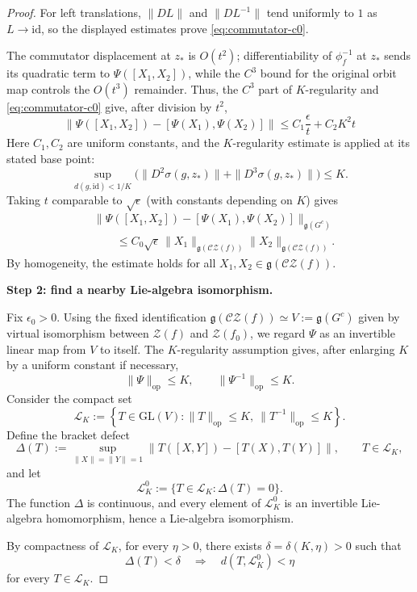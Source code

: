 \documentclass[11pt]{amsart}
\numberwithin{equation}{section}
\newcommand{\CZ}{\mathcal{CZ}}
\newcommand{\GL}{\mathrm{GL}}
\theoremstyle{plain}
\begin{document}
\begin{proof}
For left translations,  $\|DL\|$ and $\|DL^{-1}\|$ tend uniformly  to $1$
as  $L\to\mathrm{id}$, so the displayed estimates prove
\eqref{eq:commutator-c0}.

 The commutator
displacement at $z_\ast$ is $O(t^2)$;
differentiability of $\phi_f^{-1}$ at $z_\ast$ sends its quadratic term
to $\Psi([X_1,X_2])$, while the $C^3$ bound for the original orbit map
controls the $O(t^3)$ remainder.  Thus, the $C^3$ part of $K$-regularity and
\eqref{eq:commutator-c0} give, after division by $t^2$,  
 \begin{equation}
\|\Psi([X_1,X_2])-[\Psi(X_1),\Psi(X_2)]\|
\le C_1 \frac{\epsilon }{t}+C_2K^2t
\end{equation}
Here $C_1,C_2$ are uniform constants, and the
$K$-regularity estimate is applied at its stated base point:
\[
\sup_{d(g,\mathrm{id})<1/K}
\bigl(\|D^2\sigma(g,z_\ast)\|+\|D^3\sigma(g,z_\ast)\|\bigr)
\le K.
\]
Taking $t$ comparable to $\sqrt\epsilon$ (with constants depending on
$K$) gives
\begin{align}
&\|\Psi([X_1,X_2])-[\Psi(X_1),\Psi(X_2)]\|_{\mathfrak g(G^c)}
\nonumber\\
&\qquad\le C_0\sqrt{\epsilon}\,
\|X_1\|_{\mathfrak g(\CZ(f))}
\|X_2\|_{\mathfrak g(\CZ(f))}.
\label{eq:approx-Lie-hom}
\end{align}
By homogeneity, the estimate holds for all $X_1,X_2\in \mathfrak g(\CZ(f))$.

\textbf{Step 2: find a nearby Lie-algebra isomorphism.}

Fix $\epsilon_0>0$.  Using the fixed identification $
\mathfrak g(\CZ(f))\simeq V:=\mathfrak g(G^c)$ given by virtual isomorphism between $\mathcal Z(f)$ and $\mathcal Z(f_0)$,
we regard $\Psi$ as an invertible linear map from $V$ to itself.  The
$K$-regularity assumption gives, after enlarging $K$ by a uniform
constant if necessary,
\[
\|\Psi\|_{\mathrm{op}}\le K,
\qquad
\|\Psi^{-1}\|_{\mathrm{op}}\le K.
\]
Consider the compact set
\[
\mathcal L_K
 :=
 \left\{
 T\in\GL(V):
 \|T\|_{\mathrm{op}}\le K,\ 
 \|T^{-1}\|_{\mathrm{op}}\le K
 \right\}.
\]
Define the bracket defect
\[
\Delta(T)
 :=
 \sup_{\|X\|=\|Y\|=1}
 \bigl\|
 T([X,Y])-[T(X),T(Y)]
 \bigr\|,
 \qquad T\in\mathcal L_K,
\]
and let
\[
\mathcal L_K^0
 :=
 \{T\in\mathcal L_K:\Delta(T)=0\}.
\]
The function $\Delta$ is continuous, and every element of
$\mathcal L_K^0$ is an invertible Lie-algebra homomorphism, hence a
Lie-algebra isomorphism.

By compactness of $\mathcal L_K$, for every $\eta>0$, there exists
$\delta=\delta(K,\eta)>0$ such that
\begin{equation}\label{eq:defect-distance}
\Delta(T)<\delta
\quad\Longrightarrow\quad
d(T,\mathcal L_K^0)<\eta
\end{equation}
for every $T\in\mathcal L_K$. 


\end{proof}
\end{document}
